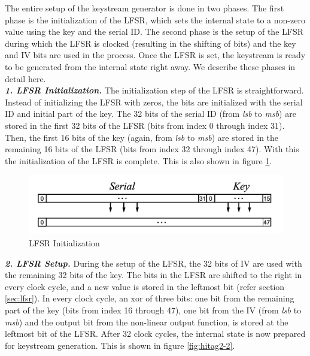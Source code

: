 The entire setup of the keystream generator is done in two phases. The first phase is the initialization of the LFSR, which sets the internal state to a non-zero value using the key and the serial ID. The second phase is the setup of the LFSR during which the LFSR is clocked (resulting in the shifting of bits) and the key and IV bits are used in the process. Once the LFSR is set, the keystream is ready to be generated from the internal state right away. We describe these phases in detail here.\\ 

\textit{\textbf{1. LFSR Initialization.}} The initialization step of the LFSR is straightforward. Instead of initializing the LFSR with zeros, the bits are initialized with the serial ID and initial part of the key. The 32 bits of the serial ID (from \emph{lsb} to \emph{msb}) are stored in the first 32 bits of the LFSR (bits from index 0 through index 31). Then, the first 16 bits of the key (again, from \emph{lsb} to \emph{msb}) are stored in the remaining 16 bits of the LFSR (bits from index 32 through index 47). With this the initialization of the LFSR is complete. This is also shown in figure \ref{fig:hitag2-1}.\\


\begin{figure}[ht!]
	\centering
		\includegraphics[width=5in]{./figures/hitag2-1.PNG}
	\caption{LFSR Initialization}	
	\label{fig:hitag2-1}
\end{figure}

\textit{\textbf{2. LFSR Setup.}} During the setup of the LFSR, the 32 bits of IV are used with the remaining 32 bits of the key. The bits in the LFSR are shifted to the right in every clock cycle, and a new value is stored in the leftmost bit (refer section \ref{sec:lfsr}). In every clock cycle, an xor of three bits: one bit from the remaining part of the key (bits from index 16 through 47), one bit from the IV (from \emph{lsb} to \emph{msb}) and the output bit from the non-linear output function, is stored at the leftmost bit of the LFSR. After 32 clock cycles, the internal state is now prepared for keystream generation. This is shown in figure \ref{fig:hitag2-2}.\\

